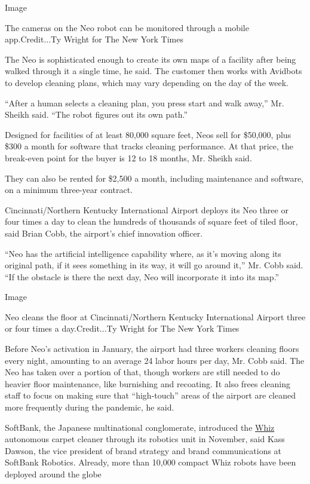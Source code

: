 Image

The cameras on the Neo robot can be monitored through a mobile
app.Credit...Ty Wright for The New York Times

The Neo is sophisticated enough to create its own maps of a facility
after being walked through it a single time, he said. The customer then
works with Avidbots to develop cleaning plans, which may vary depending
on the day of the week.

``After a human selects a cleaning plan, you press start and walk
away,'' Mr. Sheikh said. ``The robot figures out its own path.''

Designed for facilities of at least 80,000 square feet, Neos sell for
\$50,000, plus \$300 a month for software that tracks cleaning
performance. At that price, the break-even point for the buyer is 12 to
18 months, Mr. Sheikh said.

They can also be rented for \$2,500 a month, including maintenance and
software, on a minimum three-year contract.

Cincinnati/Northern Kentucky International Airport deploys its Neo three
or four times a day to clean the hundreds of thousands of square feet of
tiled floor, said Brian Cobb, the airport's chief innovation officer.

``Neo has the artificial intelligence capability where, as it's moving
along its original path, if it sees something in its way, it will go
around it,'' Mr. Cobb said. ``If the obstacle is there the next day, Neo
will incorporate it into its map.''

Image

Neo cleans the floor at Cincinnati/Northern Kentucky International
Airport three or four times a day.Credit...Ty Wright for The New York
Times

Before Neo's activation in January, the airport had three workers
cleaning floors every night, amounting to an average 24 labor hours per
day, Mr. Cobb said. The Neo has taken over a portion of that, though
workers are still needed to do heavier floor maintenance, like
burnishing and recoating. It also frees cleaning staff to focus on
making sure that ``high-touch'' areas of the airport are cleaned more
frequently during the pandemic, he said.

SoftBank, the Japanese multinational conglomerate, introduced the
\href{https://13779usreg20181102.com/us/whiz}{Whiz} autonomous carpet
cleaner through its robotics unit in November, said Kass Dawson, the
vice president of brand strategy and brand communications at SoftBank
Robotics. Already, more than 10,000 compact Whiz robots have been
deployed around the globe

